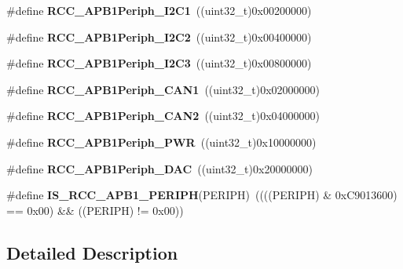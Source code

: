 \begin{DoxyCompactItemize}
\item 
\mbox{\label{group___r_c_c___a_p_b1___peripherals_ga594f87d504f7d63697d841033d1538f6}} 
\#define {\bfseries R\+C\+C\+\_\+\+A\+P\+B1\+Periph\+\_\+\+I2\+C1}~((uint32\+\_\+t)0x00200000)
\item 
\mbox{\label{group___r_c_c___a_p_b1___peripherals_ga8eaeded403b5a2277fbfb3896c639416}} 
\#define {\bfseries R\+C\+C\+\_\+\+A\+P\+B1\+Periph\+\_\+\+I2\+C2}~((uint32\+\_\+t)0x00400000)
\item 
\mbox{\label{group___r_c_c___a_p_b1___peripherals_gaec6eadaf773ba87b5ef04b03c62bbac7}} 
\#define {\bfseries R\+C\+C\+\_\+\+A\+P\+B1\+Periph\+\_\+\+I2\+C3}~((uint32\+\_\+t)0x00800000)
\item 
\mbox{\label{group___r_c_c___a_p_b1___peripherals_ga7f1d940739de0134ae89e9e04214989d}} 
\#define {\bfseries R\+C\+C\+\_\+\+A\+P\+B1\+Periph\+\_\+\+C\+A\+N1}~((uint32\+\_\+t)0x02000000)
\item 
\mbox{\label{group___r_c_c___a_p_b1___peripherals_ga62801597b97816751c038acb1466179c}} 
\#define {\bfseries R\+C\+C\+\_\+\+A\+P\+B1\+Periph\+\_\+\+C\+A\+N2}~((uint32\+\_\+t)0x04000000)
\item 
\mbox{\label{group___r_c_c___a_p_b1___peripherals_ga59ae4e17d5b35a934b1614f8ee883834}} 
\#define {\bfseries R\+C\+C\+\_\+\+A\+P\+B1\+Periph\+\_\+\+P\+WR}~((uint32\+\_\+t)0x10000000)
\item 
\mbox{\label{group___r_c_c___a_p_b1___peripherals_ga8d019a727701634822c19371b6aaabb5}} 
\#define {\bfseries R\+C\+C\+\_\+\+A\+P\+B1\+Periph\+\_\+\+D\+AC}~((uint32\+\_\+t)0x20000000)
\item 
\mbox{\label{group___r_c_c___a_p_b1___peripherals_gab68e85308494436c4c55a69c42a79f36}} 
\#define {\bfseries I\+S\+\_\+\+R\+C\+C\+\_\+\+A\+P\+B1\+\_\+\+P\+E\+R\+I\+PH}(P\+E\+R\+I\+PH)~((((P\+E\+R\+I\+PH) \& 0x\+C9013600) == 0x00) \&\& ((\+P\+E\+R\+I\+P\+H) != 0x00))
\end{DoxyCompactItemize}


\subsection{Detailed Description}
